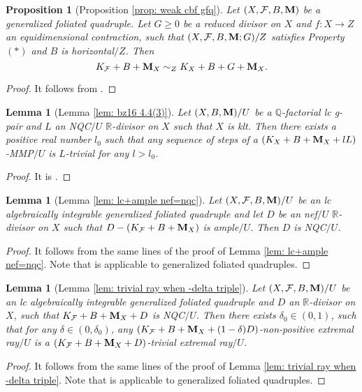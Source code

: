 \documentclass[11pt]{amsart}
\numberwithin{equation}{section}
\newcommand{\Mm}{{\bf{M}}}
\newcommand{\Qq}{\mathbb{Q}}
\newcommand{\Rr}{\mathbb{R}}
\newcommand{\Ff}{\mathcal{F}}
\newtheorem{lem}[thm]{Lemma}
\newtheorem{prop}[thm]{Proposition}
\theoremstyle{definition}
\theoremstyle{definition}
\theoremstyle{definition}
\begin{document}
\begin{prop}[Proposition \ref{prop: weak cbf gfq}]\label{prop: weak cbf gfq gfq}
Let $(X,\Ff,B,\Mm)$ be a generalized foliated quadruple. Let $G\geq 0$ be a reduced divisor on $X$ and $f: X\rightarrow Z$ an equidimensional contraction, such that $(X,\Ff,B,\Mm;G)/Z$ satisfies Property $(*)$ and $B$ is horizontal$/Z$. Then
$$K_{\Ff}+B+\Mm_X\sim_{Z}K_X+B+G+\Mm_X.$$
\end{prop}
\begin{proof}
    It follows from \cite[Proposition 7.3.6]{CHLX23}.
\end{proof}

\begin{lem}[Lemma \ref{lem: bz16 4.4(3)}]\label{lem: bz16 4.4(3) gpair}
    Let $(X,B,\Mm)/U$ be a $\Qq$-factorial lc g-pair and $L$ an NQC$/U$ $\Rr$-divisor on $X$ such that $X$ is klt. Then there exists a positive real number $l_0$ such that any sequence of steps of a $(K_X+B+\Mm_X+lL)$-MMP$/U$ is $L$-trivial for any $l>l_0$.
\end{lem}
\begin{proof}
    It is \cite[Lemma 3.22]{HL22}.
\end{proof}


\begin{lem}[Lemma \ref{lem: lc+ample nef=nqc}]\label{lem: lc+ample nef=nqc gfq}
    Let $(X,\Ff,B,\Mm)/U$ be an lc algebraically integrable generalized foliated quadruple and let $D$ be an nef$/U$ $\Rr$-divisor on $X$ such that $D-(K_{\Ff}+B+\Mm_X)$ is ample$/U$. Then $D$ is NQC$/U$.
\end{lem}
\begin{proof}
    It follows from the same lines of the proof of Lemma \ref{lem: lc+ample nef=nqc}. Note that \cite[Theorem 2.3.1]{CHLX23} is applicable to generalized foliated quadruples.
\end{proof}

\begin{lem}[Lemma \ref{lem: trivial ray when -delta triple}]\label{lem: trivial ray when -delta gfq}
Let $(X,\Ff,B,\Mm)/U$ be an lc algebraically integrable generalized foliated quadruple and $D$ an $\Rr$-divisor on $X$, such that  $K_{\Ff}+B+\Mm_X+D$ is NQC$/U$. Then there exists $\delta_0\in (0,1)$, such that for any $\delta\in (0,\delta_0)$, any $(K_{\Ff}+B+\Mm_X+(1-\delta)D)$-non-positive extremal ray$/U$ is a $(K_{\Ff}+B+\Mm_X+D)$-trivial extremal ray$/U$. 
\end{lem}\begin{proof}
    It follows from the same lines of the proof of Lemma \ref{lem: trivial ray when -delta triple}. Note that \cite[Theorem 2.3.1]{CHLX23} is applicable to generalized foliated quadruples.
\end{proof}
\end{document}
